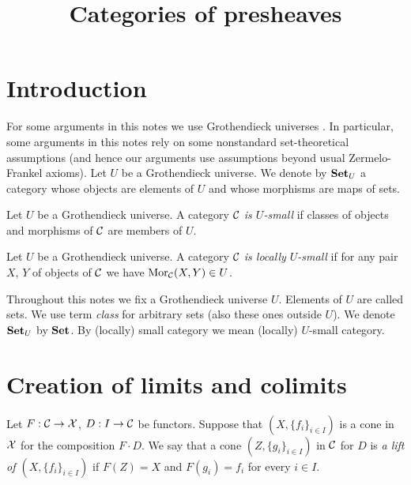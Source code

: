 



\title{Categories of presheaves}
\date{}
\maketitle

\section{Introduction}\label{section:introduction}
\noindent
For some arguments in this notes we use Grothendieck universes {\cite[page 22]{Maclane}}. In particular, some arguments in this notes rely on some nonstandard set-theoretical assumptions (and hence our arguments use assumptions beyond usual Zermelo-Frankel axioms). Let $U$ be a Grothendieck universe. We denote by $\mathbf{Set}_U$ a category whose objects are elements of $U$ and whose morphisms are maps of sets. 

\begin{definition}
Let $U$ be a Grothendieck universe. A category ${\mathcal C}$ \textit{is $U$-small} if classes of objects and morphisms of ${\mathcal C}$ are members of $U$.
\end{definition}

\begin{definition}
Let $U$ be a Grothendieck universe. A category ${\mathcal C}$ \textit{is locally $U$-small} if for any pair $X$, $Y$ of objects of ${\mathcal C}$ we have $\mathrm{Mor}_{{\mathcal C}}(X,Y)\in U$.
\end{definition}
\noindent
Throughout this notes we fix a Grothendieck universe $U$. Elements of $U$ are called sets. We use term \textit{class} for arbitrary sets (also these ones outside $U$). We denote $\mathbf{Set}_U$ by $\mathbf{Set}$.  By (locally) small category we mean (locally) $U$-small category.

\section{Creation of limits and colimits}

\begin{definition}
Let $F:{\mathcal C}\rightarrow {\mathcal X}$, $D:I\rightarrow {\mathcal C}$ be functors. Suppose that $\left(X,\{f_i\}_{i\in I}\right)$ is a cone in ${\mathcal X}$ for the composition $F\cdot D$. We say that a cone $\left(Z,\{g_i\}_{i\in I}\right)$ in ${\mathcal C}$ for $D$ is \textit{a lift of $\left(X,\{f_i\}_{i\in I}\right)$} if $F(Z)=X$ and $F(g_i)=f_i$ for every $i\in I$.
\end{definition}

